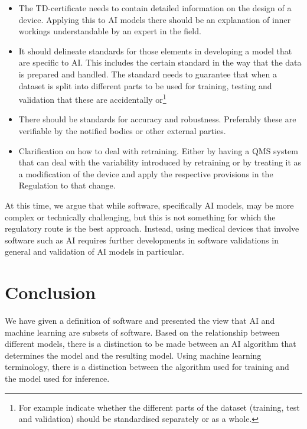 \documentclass[
]{scrartcl}
\begin{document}
\begin{itemize}
\item
  The TD-certificate needs to contain detailed information on the design of a device. Applying this to AI models there should be an explanation of inner workings understandable by an expert in the field.
\item
  It should delineate standards for those elements in developing a model that are specific to AI. This includes the certain standard in the way that the data is prepared and handled. The standard needs to guarantee that when a dataset is split into different parts to be used for training, testing and validation that these are accidentally or\footnote{For example indicate whether the different parts of the dataset (training, test and validation) should be standardised separately or as a whole.}
\item
  There should be standards for accuracy and robustness. Preferably these are verifiable by the notified bodies or other external parties.
\item
  Clarification on how to deal with retraining. Either by having a QMS system that can deal with the variability introduced by retraining or by treating it as a modification of the device and apply the respective provisions in the Regulation to that change.
\end{itemize}

At this time, we argue that while software, specifically AI models, may be more complex or technically challenging, but this is not something for which the regulatory route is the best approach. Instead, using medical devices that involve software such as AI requires further developments in software validations in general and validation of AI models in particular.

\hypertarget{conclusion}{%
\section{Conclusion}\label{conclusion}}

We have given a definition of software and presented the view that AI and machine learning are subsets of software. Based on the relationship between different models, there is a distinction to be made between an AI algorithm that determines the model and the resulting model. Using machine learning terminology, there is a distinction between the algorithm used for training and the model used for inference.
\end{document}

